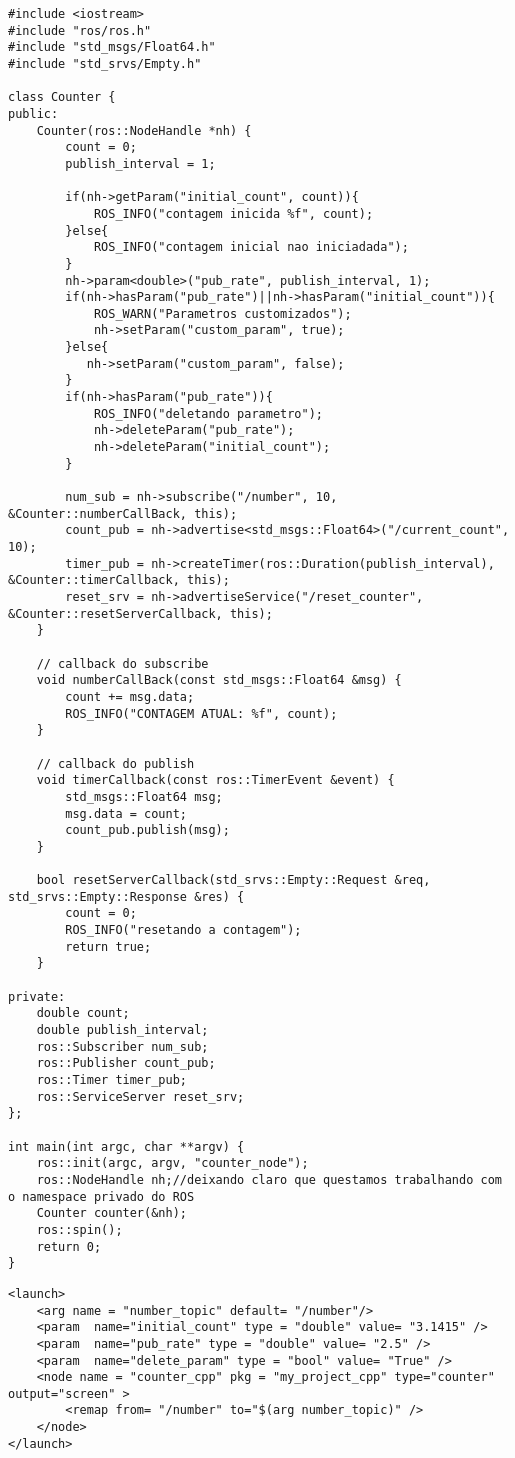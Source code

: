 \documentclass[letterpaper]{article}
\begin{document}
\begin{lstlisting}[style=cppstyle, title=counter.cpp] 
#include <iostream>
#include "ros/ros.h"
#include "std_msgs/Float64.h"
#include "std_srvs/Empty.h"

class Counter {
public:
    Counter(ros::NodeHandle *nh) {
        count = 0;                                                                           
        publish_interval = 1;

        if(nh->getParam("initial_count", count)){
            ROS_INFO("contagem inicida %f", count);
        }else{
            ROS_INFO("contagem inicial nao iniciadada");
        }
        nh->param<double>("pub_rate", publish_interval, 1);
        if(nh->hasParam("pub_rate")||nh->hasParam("initial_count")){
            ROS_WARN("Parametros customizados");
            nh->setParam("custom_param", true);
        }else{
           nh->setParam("custom_param", false); 
        }
        if(nh->hasParam("pub_rate")){
            ROS_INFO("deletando parametro");
            nh->deleteParam("pub_rate");
            nh->deleteParam("initial_count");
        }

        num_sub = nh->subscribe("/number", 10, &Counter::numberCallBack, this);
        count_pub = nh->advertise<std_msgs::Float64>("/current_count", 10);
        timer_pub = nh->createTimer(ros::Duration(publish_interval), &Counter::timerCallback, this);
        reset_srv = nh->advertiseService("/reset_counter", &Counter::resetServerCallback, this);
    }

    // callback do subscribe
    void numberCallBack(const std_msgs::Float64 &msg) {
        count += msg.data;
        ROS_INFO("CONTAGEM ATUAL: %f", count);
    }

    // callback do publish
    void timerCallback(const ros::TimerEvent &event) {
        std_msgs::Float64 msg;
        msg.data = count;
        count_pub.publish(msg); 
    }

    bool resetServerCallback(std_srvs::Empty::Request &req, std_srvs::Empty::Response &res) {
        count = 0;
        ROS_INFO("resetando a contagem");
        return true;
    }

private:
    double count;
    double publish_interval;
    ros::Subscriber num_sub;
    ros::Publisher count_pub;
    ros::Timer timer_pub;
    ros::ServiceServer reset_srv;
};

int main(int argc, char **argv) {
    ros::init(argc, argv, "counter_node");
    ros::NodeHandle nh;//deixando claro que questamos trabalhando com o namespace privado do ROS
    Counter counter(&nh);
    ros::spin();
    return 0;
}

\end{lstlisting}
\begin{lstlisting}[style=xmlstyle, title=counter\_cpp.launch] 
<launch>
    <arg name = "number_topic" default= "/number"/>
    <param  name="initial_count" type = "double" value= "3.1415" />
    <param  name="pub_rate" type = "double" value= "2.5" />
    <param  name="delete_param" type = "bool" value= "True" />
    <node name = "counter_cpp" pkg = "my_project_cpp" type="counter" output="screen" >   
        <remap from= "/number" to="$(arg number_topic)" />  
    </node> 
</launch>
\end{lstlisting}
\end{document}
